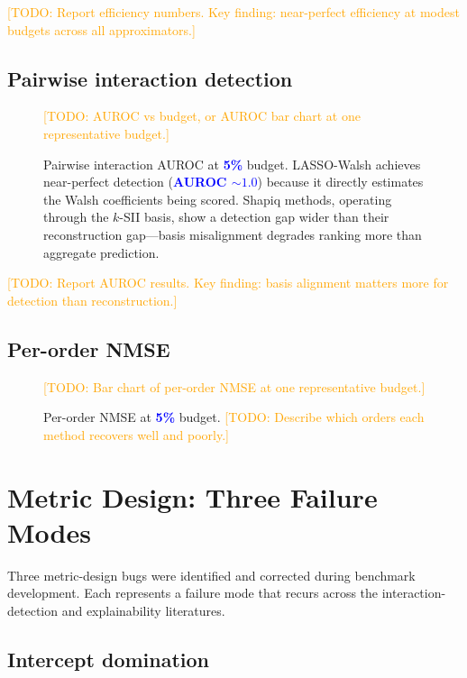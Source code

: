 \documentclass[11pt]{article}
\newcommand{\todo}[1]{\textcolor{orange}{[TODO: #1]}}
\newcommand{\numplaceholder}[1]{\textcolor{blue}{\textbf{#1}}}
\begin{document}
\todo{Report efficiency numbers. Key finding: near-perfect efficiency
at modest budgets across all approximators.}

\subsection{Pairwise interaction detection}

\begin{figure}[t]
\centering
\todo{AUROC vs budget, or AUROC bar chart at one representative budget.}
\caption{Pairwise interaction AUROC at \numplaceholder{5\%} budget.
LASSO-Walsh achieves near-perfect detection
(\numplaceholder{AUROC $\sim 1.0$}) because it directly estimates the
Walsh coefficients being scored. Shapiq methods, operating through
the $k$-SII basis, show a detection gap wider than their reconstruction
gap---basis misalignment degrades ranking more than aggregate prediction.}
\label{fig:auroc}
\end{figure}

\todo{Report AUROC results. Key finding: basis alignment matters more
for detection than reconstruction.}

\subsection{Per-order NMSE}

\begin{figure}[t]
\centering
\todo{Bar chart of per-order NMSE at one representative budget.}
\caption{Per-order NMSE at \numplaceholder{5\%} budget. \todo{Describe
which orders each method recovers well and poorly.}}
\label{fig:per-order-nmse}
\end{figure}


\section{Metric Design: Three Failure Modes}
\label{sec:audit}


Three metric-design bugs were identified and corrected during benchmark
development. Each represents a failure mode that recurs across the
interaction-detection and explainability literatures.

\subsection{Intercept domination}
\end{document}
